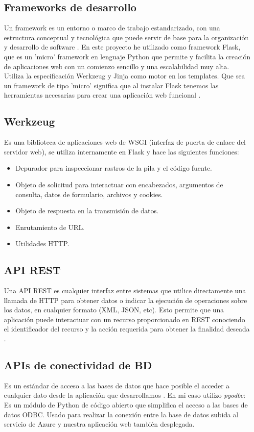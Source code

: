 
\subsection{Frameworks de desarrollo}
Un framework es un entorno o marco de trabajo estandarizado, con una estructura conceptual y tecnológica que puede servir de base para la organización y desarrollo de software \cite{wiki:framework}.\newline
En este proyecto he utilizado como framework Flask, que es un 'micro' framework en lenguaje Python que permite y facilita la creación de aplicaciones web con un comienzo sencillo y una escalabilidad muy alta. Utiliza la especificación Werkzeug y Jinja como motor en los templates.\newline
Que sea un framework de tipo 'micro' significa que al instalar Flask tenemos las herramientas necesarias para crear una aplicación web funcional \cite{FlaskDefinicion}.


\subsection{Werkzeug}
Es una biblioteca de aplicaciones web de WSGI (interfaz de puerta de enlace del servidor web), se utiliza internamente en Flask y hace las siguientes funciones:
\begin{itemize}
\item Depurador para inspeccionar rastros de la pila y el código fuente.
\item Objeto de solicitud para interactuar con encabezados, argumentos de consulta, datos de formulario, archivos y cookies.
\item Objeto de respuesta en la transmisión de datos.
\item Enrutamiento de URL.
\item Utilidades HTTP.
\end{itemize}

\subsection{API REST}
Una API REST es cualquier interfaz entre sistemas que utilice directamente una llamada de HTTP para obtener datos o indicar la ejecución de operaciones sobre los datos, en cualquier formato (XML, JSON, etc). Esto permite que una aplicación puede interactuar con un recurso proporcionado en REST conociendo el identificador del recurso y la acción requerida para obtener la finalidad deseada \cite{wiki:REST}.

\subsection{APIs de conectividad de BD}
Es un estándar de acceso a las bases de datos que hace posible el acceder a cualquier dato desde la aplicación que desarrollamos \cite{wiki:ODBC}. En mi caso utilizo \textit{pyodbc}:\newline
Es un módulo de Python de código abierto que simplifica el acceso a las bases de datos ODBC. Usado para realizar la conexión entre la base de datos subida al servicio de Azure y nuestra aplicación web también desplegada.


